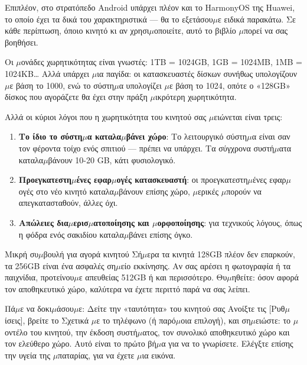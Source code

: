 Επιπλέον, στο στρατόπεδο Android υπάρχει πλέον και το HarmonyOS της Huawei, το οποίο έχει τα δικά του χαρακτηριστικά — θα το εξετάσου$\mu$ε ειδικά παρακάτω. Σε κάθε περίπτωση, όποιο κινητό κι αν χρησι$\mu$οποιείτε, αυτό το βιβλίο $\mu$πορεί να σας βοηθήσει.


Οι $\mu$ονάδες χωρητικότητας είναι γνωστές: 1TB = 1024GB, 1GB = 1024MB, 1MB = 1024KB… Αλλά υπάρχει $\mu$ια παγίδα: οι κατασκευαστές δίσκων συνήθως υπολογίζουν $\mu$ε βάση το 1000, ενώ το σύστη$\mu$α υπολογίζει $\mu$ε βάση το 1024, οπότε ο «128GB» δίσκος που αγοράζετε θα έχει στην πράξη $\mu$ικρότερη χωρητικότητα.

Αλλά οι κύριοι λόγοι που η χωρητικότητα του κινητού σας $\mu$ειώνεται είναι τρεις:

\begin{enumerate}
  \item \textbf{Το ίδιο το σύστη$\mu$α καταλα$\mu$βάνει χώρο}: Το λειτουργικό σύστη$\mu$α είναι σαν τον φέροντα τοίχο ενός σπιτιού — πρέπει να υπάρχει. Τα σύγχρονα συστή$\mu$ατα καταλα$\mu$βάνουν 10-20 GB, κάτι φυσιολογικό.
  \item \textbf{Προεγκατεστη$\mu$ένες εφαρ$\mu$ογές κατασκευαστή}: οι προεγκατεστη$\mu$ένες εφαρ$\mu$ογές στο νέο κινητό καταλα$\mu$βάνουν επίσης χώρο, $\mu$ερικές $\mu$πορούν να απεγκατασταθούν, άλλες όχι.
  \item \textbf{Απώλειες δια$\mu$ερισ$\mu$ατοποίησης και $\mu$ορφοποίησης}: για τεχνικούς λόγους, όπως η φόδρα ενός σακιδίου καταλα$\mu$βάνει επίσης όγκο.
\end{enumerate}

\begin{tcbinfo}{Μικρή συ$\mu$βουλή για αγορά κινητού}
Σή$\mu$ερα τα κινητά 128GB πλέον δεν επαρκούν, τα 256GB είναι ένα ασφαλές ση$\mu$είο εκκίνησης. Αν σας αρέσει η φωτογραφία ή τα παιχνίδια, προτείνου$\mu$ε απευθείας 512GB ή και περισσότερο. Θυ$\mu$ηθείτε: όσον αφορά τον αποθηκευτικό χώρο, καλύτερα να έχετε περιττό παρά να σας λείπει.

\end{tcbinfo}

\begin{tcbpractice}{Πά$\mu$ε να δοκι$\mu$άσου$\mu$ε: Δείτε την «ταυτότητα» του κινητού σας}
Ανοίξτε τις [Ρυθ$\mu$ίσεις], βρείτε το Σχετικά $\mu$ε το τηλέφωνο (ή παρό$\mu$οια επιλογή), και ση$\mu$ειώστε: το $\mu$οντέλο του κινητού, την έκδοση συστή$\mu$ατος, τον συνολικό αποθηκευτικό χώρο και τον ελεύθερο χώρο. Αυτό είναι το πρώτο βή$\mu$α για να το γνωρίσετε. Ελέγξτε επίσης την υγεία της $\mu$παταρίας, για να έχετε $\mu$ια εικόνα.

\end{tcbpractice}

